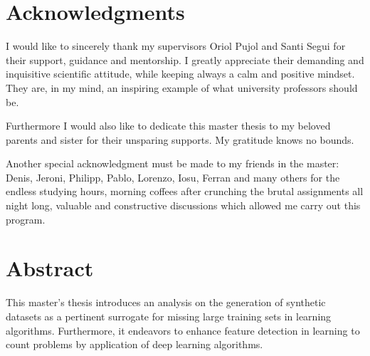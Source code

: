 \documentclass[11pt, oneside]{book}
\begin{document}
%
%
%
\setcounter{page}{3}

\thispagestyle{empty}

\thispagestyle{empty}
\chapter*{Acknowledgments}
\thispagestyle{empty}

I would like to sincerely thank my supervisors Oriol Pujol and Santi Segui for their support, guidance and mentorship. I greatly appreciate their demanding and inquisitive scientific attitude, while keeping always a calm and positive mindset. They are, in my mind, an inspiring example of what university professors should be.

Furthermore I would also like to dedicate this master thesis to my beloved parents and sister for their unsparing supports. My gratitude knows no bounds.

Another special acknowledgment must be made to my friends in the master: Denis, Jeroni, Philipp, Pablo, Lorenzo, Iosu, Ferran and many others for the endless studying hours, morning coffees after crunching the brutal assignments all night long, valuable and constructive discussions which allowed me carry out this program. 
 



\setcounter{page}{0}
\clearpage

\newpage
{} %
\chapter*{Abstract}
\thispagestyle{empty}

This master's thesis introduces an analysis on the generation of synthetic datasets as a pertinent surrogate for missing large training sets in learning algorithms. Furthermore, it endeavors to enhance feature detection in learning to count problems by application of deep learning algorithms. 
\end{document}
